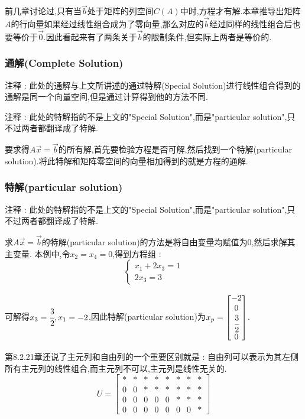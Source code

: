 \documentclass[UTF8,12pt]{ctexbook}
\begin{document}
{{{{{  前几章讨论过,只有当$\vec{b}$处于矩阵的列空间$C(A)$中时,方程才有解.本章推导出矩阵$A$的行向量如果经过线性组合成为了零向量,那么对应的$\vec{b}$经过同样的线性组合后也要等价于$\vec{0}$.因此看起来有了两条关于$\vec{b}$的限制条件,但实际上两者是等价的.
}%

\subsubsection{通解(Complete Solution)}{
  注释 : 此处的通解与上文所讲述的通过特解(Special Solution)进行线性组合得到的通解是同一个向量空间,但是通过计算得到他的方法不同.

  注释 : 此处的特解指的不是上文的"Special Solution",而是"particular solution",只不过两者都翻译成了特解.

  要求得$A\vec{x} = \vec{b}$的所有解,首先要检验方程是否可解,然后找到一个特解(particular solution).将此特解和矩阵零空间的向量相加得到的就是方程的通解.
}%

\subsubsection{特解(particular solution)}{
  注释 : 此处的特解指的不是上文的"Special Solution",而是"particular solution",只不过两者都翻译成了特解.

  求$A\vec{x} = \vec{b}$的特解(particular solution)的方法是将自由变量均赋值为0,然后求解其主变量.
  本例中,令$x_2 = x_4 = 0$,得到方程组 : $$
    \begin{cases}
      x_1 + 2x_3 = 1 \\
      2x_3 = 3
    \end{cases}
  $$

  可解得$x_3 = \cfrac{3}{2},x_1= -2$,因此特解(particular solution)为$x_p = \begin{bmatrix}
      -2           \\
      0            \\
      \cfrac{3}{2} \\
      0
    \end{bmatrix}$.

  第8.2.21章还说了主元列和自由列的一个重要区别就是 : 自由列可以表示为其左侧所有主元列的线性组合,而主元列不可以,主元列是线性无关的.
  $$
    U = \begin{bmatrix}
      \boxed{*} & * & *         & * & * & *         & * & *         \\
      0         & 0 & \boxed{*} & * & * & *         & * & *         \\
      0         & 0 & 0         & 0 & 0 & \boxed{*} & * & *         \\
      0         & 0 & 0         & 0 & 0 & 0         & 0 & \boxed{*}
    \end{bmatrix}
  $$

}}}}}
\end{document}
